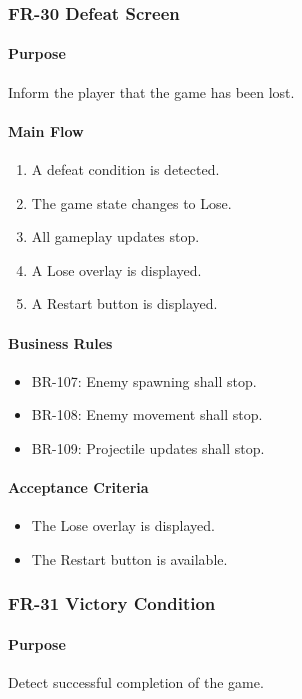\documentclass[11pt,a4paper]{article}
\begin{document}
\subsubsection{FR-30 Defeat Screen}

\paragraph{Purpose}
Inform the player that the game has been lost.

\paragraph{Main Flow}
\begin{enumerate}
  \item A defeat condition is detected.
  \item The game state changes to Lose.
  \item All gameplay updates stop.
  \item A Lose overlay is displayed.
  \item A Restart button is displayed.
\end{enumerate}

\paragraph{Business Rules}
\begin{itemize}
  \item BR-107: Enemy spawning shall stop.
  \item BR-108: Enemy movement shall stop.
  \item BR-109: Projectile updates shall stop.
\end{itemize}

\paragraph{Acceptance Criteria}
\begin{itemize}
  \item The Lose overlay is displayed.
  \item The Restart button is available.
\end{itemize}

\subsubsection{FR-31 Victory Condition}

\paragraph{Purpose}
Detect successful completion of the game.
\end{document}
